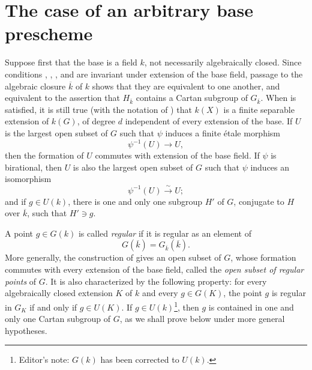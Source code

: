 \section{The case of an arbitrary base prescheme}

Suppose first that the base is a field \(k\), not necessarily
algebraically closed. Since conditions  , , ,
and  are invariant under extension of the base field, passage to
the algebraic closure \(\overline{k}\) of \(k\) shows that they are
equivalent to one another, and equivalent to the assertion that
\(H_{\overline{k}}\) contains a Cartan subgroup of
\(G_{\overline{k}}\). When  is satisfied, it is still
true (with the notation of ) that \(k(X)\) is a finite separable
extension of \(k(G)\), of degree \(d\) independent of every extension
of the base. If \(U\) is the largest open subset of \(G\) such that
\(\psi\) induces a finite étale morphism
\[
  \psi^{-1}(U)\longrightarrow U,
\]
then the formation of \(U\) commutes with extension of the base field.
If \(\psi\) is birational, then \(U\) is also the largest open subset
of \(G\) such that \(\psi\) induces an isomorphism
\[
  \psi^{-1}(U)\xrightarrow{\sim}U;
\]
and if \(g\in U(k)\), there is one and only one subgroup \(H'\) of
\(G\), conjugate to \(H\) over \(\overline{k}\), such that
\(H'\ni g\).

A point \(g\in G(k)\) is called \emph{regular} if it is regular as an
element of
\[
  G(\overline{k})=G_{\overline{k}}(\overline{k}).
\]
More generally, the construction of  gives an open subset of \(G\),
whose formation commutes with every extension of the base field,
called the \emph{open subset of regular points} of \(G\). It is also
characterized by the following property: for every algebraically
closed extension \(K\) of \(k\) and every \(g\in G(K)\), the point
\(g\) is regular in \(G_K\) if and only if \(g\in U(K)\). If
\(g\in U(k)\)\footnote{Editor's note: \(G(k)\) has been corrected to
\(U(k)\).}, then \(g\) is contained in one and only one Cartan
subgroup of \(G\), as we shall prove below under more general
hypotheses.

